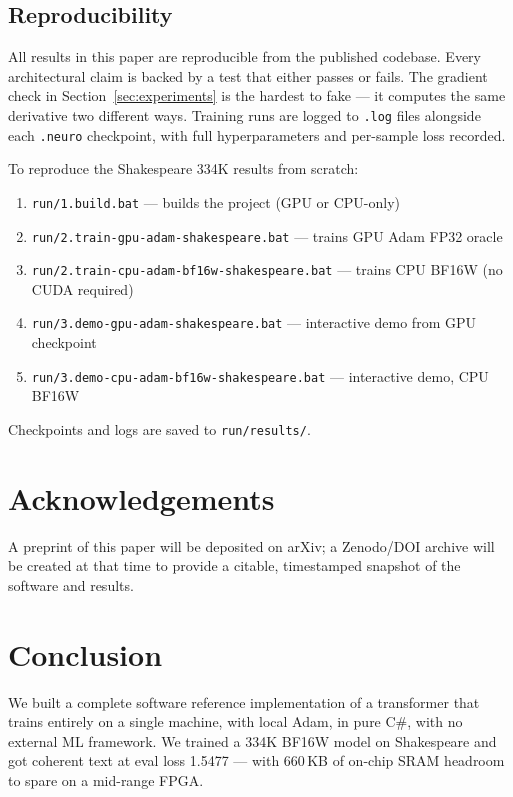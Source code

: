 \documentclass[11pt]{article}
\begin{document}
\subsection{Reproducibility}

All results in this paper are reproducible from the published codebase.
Every architectural claim is backed by a test that either passes or fails.
The gradient check in Section~\ref{sec:experiments} is the hardest to fake ---
it computes the same derivative two different ways. Training runs are logged
to \texttt{.log} files alongside each \texttt{.neuro} checkpoint, with full
hyperparameters and per-sample loss recorded.

To reproduce the Shakespeare 334K results from scratch:
\begin{enumerate}
  \item \texttt{run/1.build.bat} --- builds the project (GPU or CPU-only)
  \item \texttt{run/2.train-gpu-adam-shakespeare.bat} --- trains GPU Adam FP32 oracle
  \item \texttt{run/2.train-cpu-adam-bf16w-shakespeare.bat} --- trains CPU BF16W (no CUDA required)
  \item \texttt{run/3.demo-gpu-adam-shakespeare.bat} --- interactive demo from GPU checkpoint
  \item \texttt{run/3.demo-cpu-adam-bf16w-shakespeare.bat} --- interactive demo, CPU BF16W
\end{enumerate}

Checkpoints and logs are saved to \texttt{run/results/}.

\section*{Acknowledgements}

A preprint of this paper will be deposited on arXiv; a Zenodo/DOI archive will be
created at that time to provide a citable, timestamped snapshot of the software and results.

\section{Conclusion}

We built a complete software reference implementation of a transformer that trains
entirely on a single machine, with local Adam, in pure C\#, with no external ML
framework. We trained a 334K BF16W model on Shakespeare and got coherent text at
eval loss 1.5477 --- with 660\,KB of on-chip SRAM headroom to spare on a mid-range FPGA.
\end{document}
